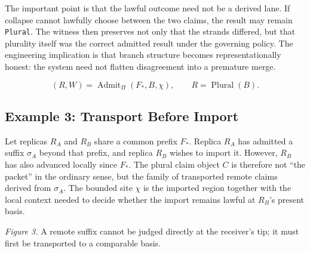 \documentclass[11pt]{article}
\theoremstyle{definition}
\theoremstyle{plain}
\theoremstyle{remark}
\begin{document}
The important point is that the lawful outcome need not be a derived lane. If collapse cannot lawfully choose between the two claims, the result may remain \texttt{Plural}. The witness then preserves not only that the strands differed, but that plurality itself was the correct admitted result under the governing policy. The engineering implication is that branch structure becomes representationally honest: the system need not flatten disagreement into a premature merge.

\[
(R, W)
=
\operatorname{Admit}_{\Pi}(F_*, B, \chi),
\qquad
R = \operatorname{Plural}(B).
\]

\subsection{Example 3: Transport Before Import}

Let replicas \(R_A\) and \(R_B\) share a common prefix \(F_*\). Replica \(R_A\) has admitted a suffix \(\sigma_A\) beyond that prefix, and replica \(R_B\) wishes to import it. However, \(R_B\) has also advanced locally since \(F_*\). The plural claim object \(C\) is therefore not ``the packet'' in the ordinary sense, but the family of transported remote claims derived from \(\sigma_A\). The bounded site \(\chi\) is the imported region together with the local context needed to decide whether the import remains lawful at \(R_B\)'s present basis.

\begin{center}

\smallskip
\emph{Figure 3.} A remote suffix cannot be judged directly at the receiver's tip; it must first be transported to a comparable basis.
\end{center}
\end{document}
